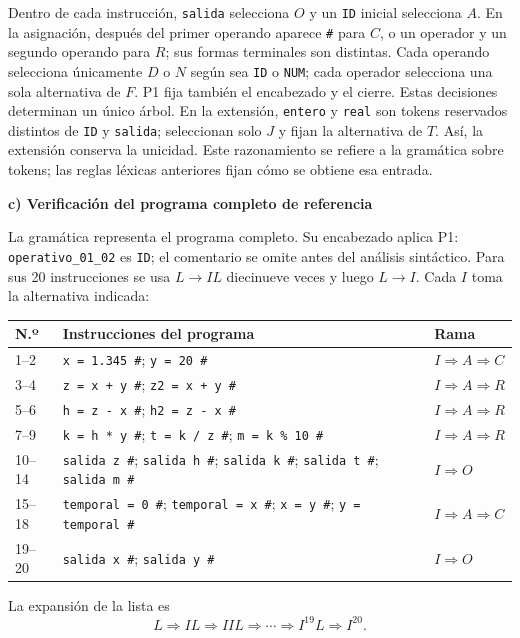\documentclass[11pt,letterpaper]{article}
\newcommand{\cod}[1]{\texttt{#1}}
\newcommand{\subtitulo}[1]{\vspace{5pt}\textbf{#1}\par\nopagebreak[4]}
\newcommand{\cab}[1]{\rowcolor{cabecera}#1}
\begin{document}
Dentro de cada instrucción, \cod{salida} selecciona $O$ y un \cod{ID} inicial selecciona $A$. En la asignación, después del primer operando aparece \cod{\#} para $C$, o un operador y un segundo operando para $R$; sus formas terminales son distintas. Cada operando selecciona únicamente $D$ o $N$ según sea \cod{ID} o \cod{NUM}; cada operador selecciona una sola alternativa de $F$. P1 fija también el encabezado y el cierre. Estas decisiones determinan un único árbol. En la extensión, \cod{entero} y \cod{real} son tokens reservados distintos de \cod{ID} y \cod{salida}; seleccionan solo $J$ y fijan la alternativa de $T$. Así, la extensión conserva la unicidad. Este razonamiento se refiere a la gramática sobre tokens; las reglas léxicas anteriores fijan cómo se obtiene esa entrada.

\newpage
\subtitulo{c) Verificación del programa completo de referencia}
La gramática representa el programa completo. Su encabezado aplica P1: \cod{operativo\_01\_02} es \cod{ID}; el comentario se omite antes del análisis sintáctico. Para sus 20 instrucciones se usa $L\to IL$ diecinueve veces y luego $L\to I$. Cada $I$ toma la alternativa indicada:
\begin{center}\small
\begin{tabularx}{\textwidth}{|p{1.2cm}|p{8.2cm}|X|}\hline
\cab{\textbf{N.º}&\textbf{Instrucciones del programa}&\textbf{Rama}}\\\hline
1--2&\cod{x = 1.345 \#}; \cod{y = 20 \#}&$I\Rightarrow A\Rightarrow C$\\\hline
3--4&\cod{z = x + y \#}; \cod{z2 = x + y \#}&$I\Rightarrow A\Rightarrow R$\\\hline
5--6&\cod{h = z - x \#}; \cod{h2 = z - x \#}&$I\Rightarrow A\Rightarrow R$\\\hline
7--9&\cod{k = h * y \#}; \cod{t = k / z \#}; \cod{m = k \% 10 \#}&$I\Rightarrow A\Rightarrow R$\\\hline
10--14&\cod{salida z \#}; \cod{salida h \#}; \cod{salida k \#}; \cod{salida t \#}; \cod{salida m \#}&$I\Rightarrow O$\\\hline
15--18&\cod{temporal = 0 \#}; \cod{temporal = x \#}; \cod{x = y \#}; \cod{y = temporal \#}&$I\Rightarrow A\Rightarrow C$\\\hline
19--20&\cod{salida x \#}; \cod{salida y \#}&$I\Rightarrow O$\\\hline
\end{tabularx}\end{center}
La expansión de la lista es
\[
L\Rightarrow IL\Rightarrow IIL\Rightarrow\cdots\Rightarrow I^{19}L\Rightarrow I^{20}.
\]
\end{document}
